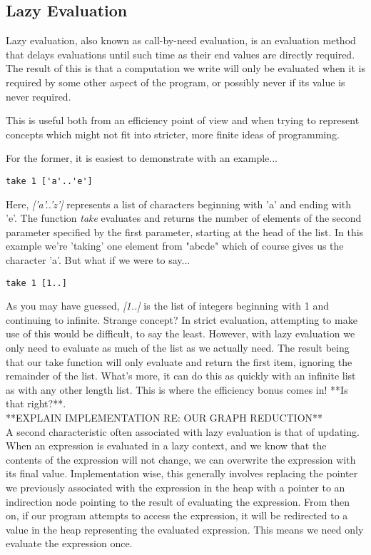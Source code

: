 \documentclass[11pt]{article}
\begin{document}
\subsection{Lazy Evaluation}
Lazy evaluation, also known as call-by-need evaluation, is an evaluation method
that delays evaluations until such time as their end values are directly
required. The result of this is that a computation we write will only be 
evaluated when it is required by some other aspect of the program, or possibly never
if its value is never required. 

This is useful both from an efficiency point of view and when trying to 
represent concepts which might not fit into stricter, more finite ideas of
programming. 

For the former, it is easiest to demonstrate with an example...
\begin{verbatim}
take 1 ['a'..'e']
\end{verbatim}
Here, \emph{['a'..'z']} represents a list of characters beginning with 'a' and 
ending with 'e'. The function \emph{take} evaluates and returns the number of
elements of the second parameter specified by the first parameter, starting at the
head of the list. In this example we're 'taking' one element from "abcde" which
of course gives us the character 'a'. But what if we were to say...
\begin{verbatim}
take 1 [1..]
\end{verbatim}
As you may have guessed, \emph{[1..]} is the list of integers beginning with 1
and continuing to infinite. Strange concept? In strict evaluation, attempting
to make use of this would be difficult, to say the least. However, with lazy 
evaluation we only need to evaluate as much of the list as we actually need.
The result being that our take function will only evaluate and return the 
first item, ignoring the remainder of the list. What's more, it can do this
as quickly with an infinite list as with any other length list. This is where the
efficiency bonus comes in! **Is that right?**. \\


**EXPLAIN IMPLEMENTATION RE: OUR GRAPH REDUCTION**  \\


A second characteristic often associated with lazy evaluation is that of 
updating. When an expression is evaluated in a lazy context, and we know
that the contents of the expression will not change, we can overwrite the
expression with its final value. Implementation wise, this generally involves
replacing the pointer we previously associated with the expression in the
heap with a pointer to an indirection node pointing to the result of 
evaluating the expression. From then on, if our program attempts to 
access the expression, it will be redirected to a value in the heap 
representing the evaluated expression. This means we need only evaluate
the expression once. 
\end{document}
